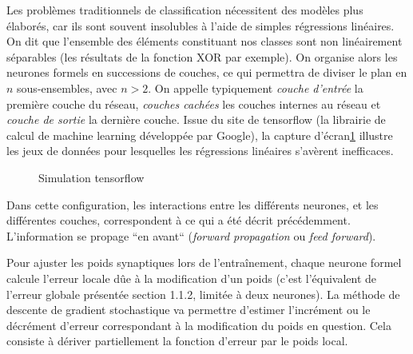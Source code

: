 \documentclass[a4paper,10pt]{report}
\begin{document}
Les problèmes traditionnels de classification nécessitent des modèles plus élaborés, car ils sont souvent insolubles à l'aide de simples régressions linéaires. On dit que l'ensemble des éléments constituant nos classes
sont non linéairement séparables (les résultats de la fonction XOR par exemple). On organise alors les neurones formels en successions de couches, ce qui permettra de diviser le plan en $n$ sous-ensembles, avec $n >2$.
On appelle typiquement \textit{couche d'entrée} la première couche du réseau, \textit{couches cachées} les couches internes au réseau et \textit{couche de sortie} la dernière couche.
Issue du site de tensorflow\cite{Bib_PlaygroundTF} (la librairie de calcul de machine learning développée par Google\cite{Bib_TenFlo}), la capture d'écran\ref{fig:c1p2s2} illustre les jeux de données pour lesquelles les régressions linéaires s'avèrent inefficaces.

\begin{figure}[H]
    \centering
    \caption{Simulation tensorflow}
    \label{fig:c1p2s2}
\end{figure}


Dans cette configuration, les interactions entre les différents neurones, et les différentes couches, correspondent à ce qui a été décrit précédemment. L'information se propage ``en avant`` (\textit{forward propagation} ou \textit{feed forward}).
\par
Pour ajuster les poids synaptiques lors de l'entraînement, chaque neurone formel calcule l'erreur locale dûe à la modification d'un poids (c'est l'équivalent de l'erreur globale présentée section 1.1.2, limitée à deux neurones). 
La méthode de descente de gradient stochastique\cite{Bib_WikiSGD} va permettre d'estimer l'incrément ou le décrément d'erreur correspondant à la modification du poids en question. Cela consiste à dériver partiellement la fonction d'erreur par le poids local. 
\end{document}
